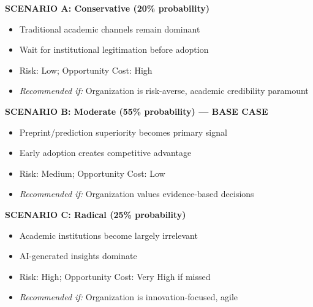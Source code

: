 \begin{tcolorbox}[colback=orange!5!white, colframe=orange!75!black,
    title=\textbf{SCENARIO PLANNING: Strategic Implications}]

\textbf{SCENARIO A: Conservative (20\% probability)}
\begin{itemize}[nosep]
\item Traditional academic channels remain dominant
\item Wait for institutional legitimation before adoption
\item Risk: Low; Opportunity Cost: High
\item \textit{Recommended if:} Organization is risk-averse, academic credibility paramount
\end{itemize}

\textbf{SCENARIO B: Moderate (55\% probability) --- BASE CASE}
\begin{itemize}[nosep]
\item Preprint/prediction superiority becomes primary signal
\item Early adoption creates competitive advantage
\item Risk: Medium; Opportunity Cost: Low
\item \textit{Recommended if:} Organization values evidence-based decisions
\end{itemize}

\textbf{SCENARIO C: Radical (25\% probability)}
\begin{itemize}[nosep]
\item Academic institutions become largely irrelevant
\item AI-generated insights dominate
\item Risk: High; Opportunity Cost: Very High if missed
\item \textit{Recommended if:} Organization is innovation-focused, agile
\end{itemize}

\end{tcolorbox}

